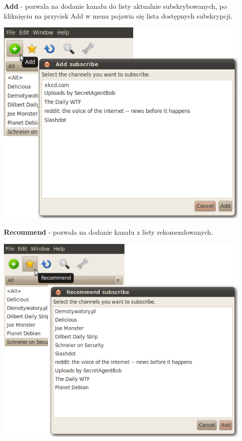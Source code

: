 \documentclass[a4paper,11pt]{report}
\begin{document}
\begin{itemize}
	\item[\textbf{Add}] - pozwala na dodanie kanału do listy aktualnie subskrybowanych,
		po kliknięciu na przycisk Add w menu pojawia się lista dostępnych subskrypcji.
	\begin{center}
		\includegraphics[scale=0.5]{./img/menu_add.png}
	\end{center}

	\newpage
	\item[\textbf{Recommend}] - pozwala na dodanie kanału z listy rekomendowanych.
	\begin{center}
		\includegraphics[scale=0.5]{./img/menu_recom.png}
	\end{center}


\end{itemize}
\end{document}
